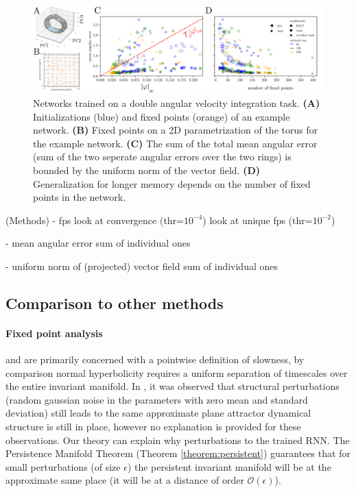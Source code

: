 \documentclass{article} %
\newcommand{\ascomment}[1]{\textcolor{ascolor}{(#1)}}
\newcounter{ct}
\theoremstyle{definition}
\theoremstyle{remark}
\begin{document}
\begin{figure}[tbhp]
  \centering
  \includegraphics[width=\textwidth]{davit}
  \caption{%
      Networks trained on a double angular velocity integration task.
    \textbf{(A)} Initializations (blue) and fixed points (orange) of an example network.
    \textbf{(B)} Fixed points on a 2D parametrization of the torus for the example network.
    \textbf{(C)} The sum of the total mean angular error (sum of the two seperate angular errors over the two rings) is bounded by the uniform norm of the vector field.
    \textbf{(D)} Generalization for longer memory depends on the number of fixed points in the network.
}\label{fig:davit}
\end{figure}



\ascomment{Methods}
- fps
       look at convergence (thr=\(10^{-4}\))
       look at unique fps (thr=\(10^{-2}\))
       
- mean angular error
sum of individual ones

- uniform norm of (projected) vector field
sum of individual ones



\newpage
\subsection{Comparison to other methods}

\paragraph{Fixed point analysis}

\citep{sussillo2013blackbox} and \citep{golub2018fixedpointfinder} are primarily concerned with a pointwise definition of slowness, by comparison normal hyperbolicity requires a uniform separation of timescales over the entire invariant manifold.
In \citep{sussillo2013blackbox}, it was observed that structural perturbations  (random gaussian noise in the parameters with zero mean and standard deviation) still leads to the same approximate plane attractor dynamical structure is still in place, however no explanation is provided for these observations.
Our theory can explain why perturbations to the trained RNN.
The Persistence Manifold Theorem (Theorem \ref{theorem:persistent}) guarantees that for small perturbations (of size \(\epsilon\)) the persistent invariant manifold will be at the approximate same place (it will be at a distance of order \(\mathcal{O}(\epsilon)\)).
\end{document}
